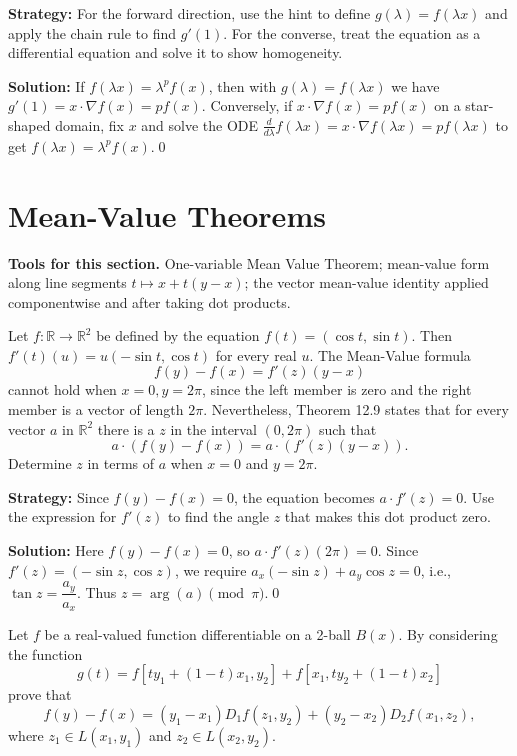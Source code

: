 \noindent\textbf{Strategy:} For the forward direction, use the hint to define \( g(\lambda) = f(\lambda x) \) and apply the chain rule to find \( g'(1) \). For the converse, treat the equation as a differential equation and solve it to show homogeneity.

\bigskip\noindent\textbf{Solution:}
If $f(\lambda x)=\lambda^p f(x)$, then with $g(\lambda)=f(\lambda x)$ we have $g'(1)=x\cdot\nabla f(x)=p f(x)$. Conversely, if $x\cdot\nabla f(x)=p f(x)$ on a star-shaped domain, fix $x$ and solve the ODE $\tfrac{d}{d\lambda}f(\lambda x)=x\cdot\nabla f(\lambda x)=p f(\lambda x)$ to get $f(\lambda x)=\lambda^p f(x)$.\qed
\section{Mean-Value Theorems}

\noindent\textbf{Tools for this section.} One-variable Mean Value Theorem; mean-value form along line segments $t\mapsto x+t(y-x)$; the vector mean-value identity applied componentwise and after taking dot products.



\begin{problembox}
Let \( f: \mathbb{R} \rightarrow \mathbb{R}^2 \) be defined by the equation \( f(t) = (\cos t, \sin t) \). Then \( f'(t)(u) = u(-\sin t, \cos t) \) for every real \( u \). The Mean-Value formula
\[f(y) - f(x) = f'(z)(y - x)\]
cannot hold when \( x = 0, y = 2\pi \), since the left member is zero and the right member is a vector of length \( 2\pi \). Nevertheless, Theorem 12.9 states that for every vector \( a \) in \( \mathbb{R}^2 \) there is a \( z \) in the interval \( (0, 2\pi) \) such that
\[a \cdot (f(y) - f(x)) = a \cdot (f'(z)(y - x)).\]
Determine \( z \) in terms of \( a \) when \( x = 0 \) and \( y = 2\pi \).
\end{problembox}

\noindent\textbf{Strategy:} Since \( f(y) - f(x) = 0 \), the equation becomes \( a \cdot f'(z) = 0 \). Use the expression for \( f'(z) \) to find the angle \( z \) that makes this dot product zero.

\bigskip\noindent\textbf{Solution:}
Here $f(y)-f(x)=0$, so $a\cdot f'(z)(2\pi)=0$. Since $f'(z)=(-\sin z,\cos z)$, we require $a_x(-\sin z)+a_y\cos z=0$, i.e., $\tan z=\dfrac{a_y}{a_x}$. Thus $z=\arg(a)\pmod{\pi}$.\qed


\begin{problembox}
Let \( f \) be a real-valued function differentiable on a 2-ball \( B(x) \). By considering the function
\[g(t) = f[ty_1 + (1 - t)x_1, y_2] + f[x_1, ty_2 + (1 - t)x_2]\]
prove that
\[f(y) - f(x) = (y_1 - x_1)D_1f(z_1, y_2) + (y_2 - x_2)D_2f(x_1, z_2),\]
where \( z_1 \in L(x_1, y_1) \) and \( z_2 \in L(x_2, y_2) \).
\end{problembox}

